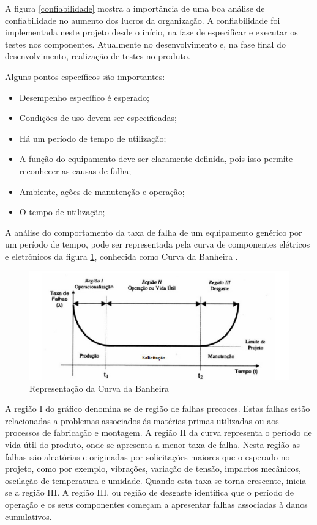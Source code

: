 A figura \ref{confiabilidade} mostra a importância de uma boa análise de confiabilidade no aumento dos lucros da organização. A confiabilidade foi implementada neste projeto desde o início, na fase de especificar e executar os testes nos componentes. Atualmente no desenvolvimento e, na fase final do desenvolvimento, realização de testes no produto.

Alguns pontos específicos são importantes:
\begin{itemize}
\item Desempenho específico é esperado;
\item Condições de uso devem ser especificadas;
\item Há um período de tempo de utilização;
\item A função do equipamento deve ser claramente definida, pois isso permite reconhecer as causas de falha;
\item Ambiente, ações de manutenção e operação;
\item O tempo de utilização;
\end{itemize}

A análise do comportamento da taxa de falha de um equipamento genérico por um período de tempo, pode ser representada pela curva de componentes elétricos e eletrônicos da figura \ref{banheira}, conhecida como Curva da Banheira \cite{castro}.

\begin{figure}[H]
		\centering
			\includegraphics[scale=1.0]{figuras/banheira.png}
		\caption{Representação da Curva da Banheira \cite{castro}}
		\label{banheira}
\end{figure}

A região I do gráfico denomina se de região de falhas precoces. Estas falhas estão relacionadas a problemas associados ás matérias primas utilizadas ou aos processos de fabricação e montagem. A região II da curva representa o período de vida útil do produto, onde se apresenta a menor taxa de falha. Nesta região as falhas são aleatórias e originadas por solicitações maiores que o esperado no projeto, como por exemplo, vibrações, variação de tensão, impactos mecânicos, oscilação de temperatura e umidade. Quando esta taxa se torna crescente, inicia se a região III. A região III, ou região de desgaste identifica que o período de operação e os seus componentes começam a apresentar falhas associadas à danos cumulativos.



